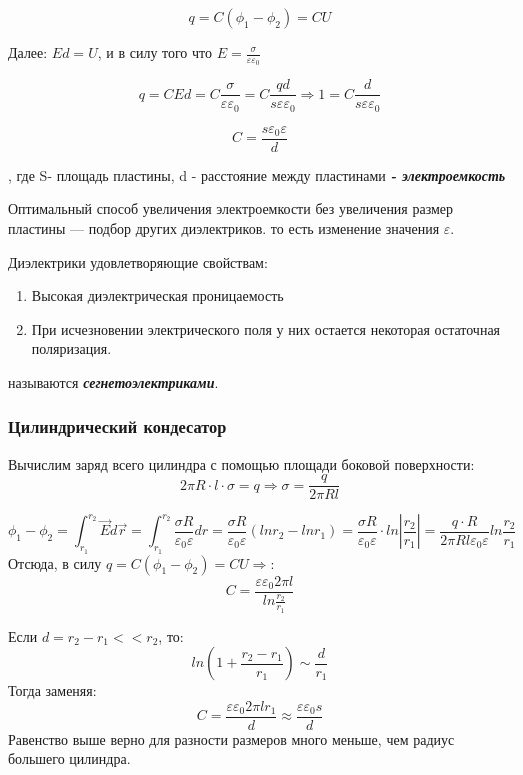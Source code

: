 \documentclass[../main.tex]{subfiles}
\begin{document}
\[q = C(\phi_1 - \phi_2) = CU\]

Далее: $Ed = U$, и в силу того что $E = \frac{\sigma}{\varepsilon \varepsilon_0}$

\[q = CEd = C\frac{\sigma}{\varepsilon \varepsilon_0} = C\frac{qd}{s\varepsilon \varepsilon_0} \Rightarrow 1 = C \frac{d}{s \varepsilon \varepsilon_0}\]

\[C = \frac{s\varepsilon_0\varepsilon}{d}\]

\begin{center}
    , где S- площадь пластины, d - расстояние между пластинами
    \newline
    \textbf{\textit{- электроемкость}}
\end{center}

Оптимальный способ увеличения электроемкости без увеличения размер пластины --- подбор других диэлектриков. то есть
изменение значения $\varepsilon$.

 Диэлектрики удовлетворяющие свойствам:
\begin{enumerate}
    \item Высокая диэлектрическая проницаемость
    \item При исчезновении электрического поля у них остается некоторая остаточная поляризация.
\end{enumerate}
называются \textit{\textbf{сегнетоэлектриками}}.

\subsubsection{Цилиндрический кондесатор}

Вычислим заряд всего цилиндра с помощью площади боковой поверхности:
\[2 \pi R \cdot l \cdot \sigma = q \Rightarrow \sigma = \frac{q}{2 \pi R l}\]

\[\phi_1 - \phi_2 = \int_{r_1}^{r_2} \vec E d\vec r = \int_{r_1}^{r_2} \frac{\sigma R}{\varepsilon_0 \varepsilon} dr = \frac{\sigma R}{\varepsilon_0 \varepsilon}(ln r_2 - ln r_1)
    = \frac{\sigma R}{\varepsilon_0 \varepsilon} \cdot ln{|\frac{r_2}{r_1}|} = \frac{q \cdot R}{2 \pi R l \varepsilon_0 \varepsilon} ln{\frac{r_2}{r_1}}\]
Отсюда, в силу $q = C(\phi_1 - \phi_2) = CU \Rightarrow$:
\[C = \frac{\varepsilon \varepsilon_0 2 \pi l}{ln{\frac{r_2}{r_1}}}\]

Если $d = r_2 - r_1 << r_2$, то:
\[ln(1+ \frac{r_2 - r_1}{r_1}) \sim \frac{d}{r_1}\]
Тогда заменяя:
\[C = \frac{\varepsilon \varepsilon_0 2 \pi l r_1}{d} \approx \frac{\varepsilon \varepsilon_0 s}{d}\]
Равенство выше верно для разности размеров много меньше, чем радиус большего цилиндра.
\end{document}
